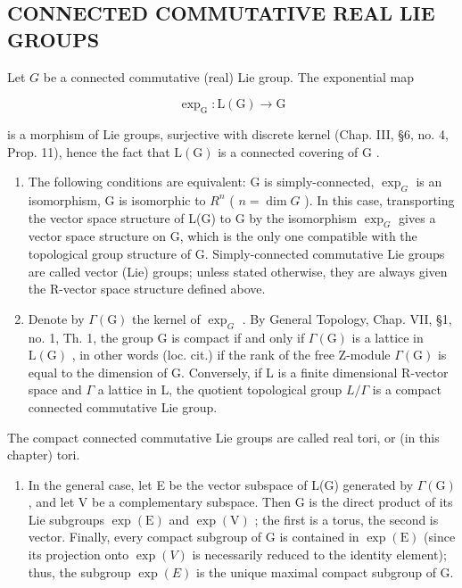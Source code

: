 \subsection{CONNECTED COMMUTATIVE REAL LIE GROUPS}

Let \(G\) be a connected commutative (real) Lie group. The exponential map

\[
\exp_ {\mathrm{G}}: \mathrm{L} (\mathrm{G}) \to \mathrm{G}
\]

is a morphism of Lie groups, surjective with discrete kernel (Chap. III, §6, no. 4, Prop. 11), hence the fact that \(\mathrm{L}(\mathrm{G})\) is a connected covering of \(\mathrm{G}\) .

\begin{enumerate}
\def\labelenumi{\alph{enumi})}
\item
  The following conditions are equivalent: G is simply-connected, \(\exp_{G}\) is an isomorphism, G is isomorphic to \(R^{n}\) ( \(n = \dim G\) ). In this case, transporting the vector space structure of L(G) to G by the isomorphism \(\exp_{G}\) gives a vector space structure on G, which is the only one compatible with the topological group structure of G. Simply-connected commutative Lie groups are called vector (Lie) groups; unless stated otherwise, they are always given the R-vector space structure defined above.
\item
  Denote by \(\Gamma(\mathrm{G})\) the kernel of \(\exp_{G}\) . By General Topology, Chap. VII, §1, no. 1, Th. 1, the group G is compact if and only if \(\Gamma(\mathrm{G})\) is a lattice in \(\mathrm{L}(\mathrm{G})\) , in other words (loc. cit.) if the rank of the free Z-module \(\Gamma(\mathrm{G})\) is equal to the dimension of G. Conversely, if L is a finite dimensional R-vector space and \(\Gamma\) a lattice in L, the quotient topological group \(L/\Gamma\) is a compact connected commutative Lie group.
\end{enumerate}

The compact connected commutative Lie groups are called real tori, or (in this chapter) tori.

\begin{enumerate}
\def\labelenumi{\alph{enumi})}
\setcounter{enumi}{2}
\tightlist
\item
  In the general case, let E be the vector subspace of L(G) generated by \(\Gamma(\mathrm{G})\) , and let V be a complementary subspace. Then G is the direct product of its Lie subgroups \(\exp(\mathrm{E})\) and \(\exp(\mathrm{V})\) ; the first is a torus, the second is vector. Finally, every compact subgroup of G is contained in \(\exp(\mathrm{E})\) (since its projection onto \(\exp(V)\) is necessarily reduced to the identity element); thus, the subgroup \(\exp(E)\) is the unique maximal compact subgroup of G.
\end{enumerate}

